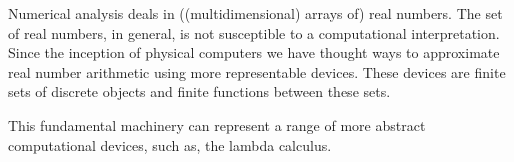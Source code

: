 Numerical analysis deals in ((multidimensional) arrays of) real numbers. The
set of real numbers, in general, is not susceptible to a computational
interpretation\cite{turing-1936-7-computability}. Since the inception of
physical computers we have thought ways to approximate real number arithmetic
using more representable devices. These devices are finite sets of discrete
objects and finite functions between these sets.

This fundamental machinery can represent a range of more abstract computational
devices, such as, the lambda calculus.
